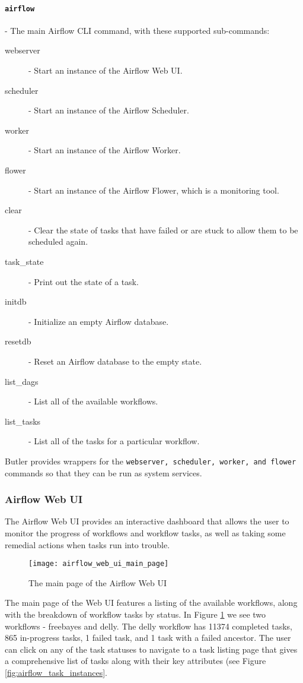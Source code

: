 \paragraph{\texttt{airflow}} - The main Airflow CLI command, with these supported sub-commands:

\begin{description}
\item [webserver] - Start an instance of the Airflow Web UI.
\item [scheduler] - Start an instance of the Airflow Scheduler.
\item [worker] - Start an instance of the Airflow Worker.
\item [flower] - Start an instance of the Airflow Flower, which is a monitoring tool.
\item [clear] - Clear the state of tasks that have failed or are stuck to allow them to be scheduled again.
\item [task\_state] - Print out the state of a task.
\item [initdb] - Initialize an empty Airflow database.
\item [resetdb] - Reset an Airflow database to the empty state.
\item [list\_dags] - List all of the available workflows.
\item [list\_tasks] - List all of the tasks for a particular workflow.
\end{description}

Butler provides wrappers for the \texttt{webserver, scheduler, worker, and flower} commands so that they can be run as system services.

\subsubsection{Airflow Web UI}

The Airflow Web UI provides an interactive dashboard that allows the user to monitor the progress of workflows and workflow tasks, as well as taking some remedial actions when tasks run into trouble.

\begin{figure}[h]
\texttt{[image: airflow\_web\_ui\_main\_page]}
\centering
\caption {The main page of the Airflow Web UI}
\label{fig:airflow_web_ui_main_page}
\end{figure}

The main page of the Web UI features a listing of the available workflows, along with the breakdown of workflow tasks by status. In Figure \ref{fig:airflow_web_ui_main_page} we see two workflows - freebayes and delly. The delly workflow has 11374 completed tasks, 865 in-progress tasks, 1 failed task, and 1 task with a failed ancestor. The user can click on any of the task statuses to navigate to a task listing page that gives a comprehensive list of tasks along with their key attributes (see Figure \ref{fig:airflow_task_instances}.


